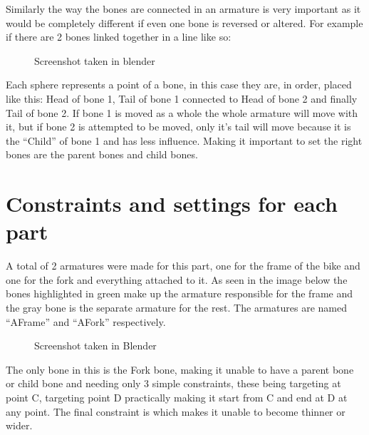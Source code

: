 \documentclass[letterpaper,10pt,english]{jupyterBook}
\begin{document}
\sphinxAtStartPar
Similarly the way the bones are connected in an armature is very important as it would be completely different if even one bone is reversed or altered. For example if there are 2 bones linked together in a line like so:

\begin{figure}[htbp]
\centering
\capstart

\noindent{}
\caption{Screenshot taken in blender}\label{\detokenize{Setting the Rig:bones}}\end{figure}

\sphinxAtStartPar
Each sphere represents a point of a bone, in this case they are, in order, placed like this: Head of bone 1, Tail of bone 1 connected to Head of bone 2 and finally Tail of bone 2. If bone 1 is moved as a whole the whole armature will move with it, but if bone 2 is attempted to be moved, only it’s tail will move because it is the “Child” of bone 1 and has less influence. Making it important to set the right bones are the parent bones and child bones.


\section{Constraints and settings for each part}
\label{\detokenize{Setting the Rig:constraints-and-settings-for-each-part}}
\sphinxAtStartPar
A total of 2 armatures were made for this part, one for the frame of the bike and one for the fork and everything attached to it. As seen in the image below the bones highlighted in green make up the armature responsible for the frame and the gray bone is the separate armature for the rest. The armatures are named “AFrame” and “AFork” respectively.

\begin{figure}[htbp]
\centering
\capstart

\noindent{}
\caption{Screenshot taken in Blender}\label{\detokenize{Setting the Rig:bike-rigs}}\end{figure}

\sphinxAtStartPar
{} The only bone in this is the Fork bone, making it unable to have a parent bone or child bone and needing only 3 simple constraints, these being  targeting at point C,  targeting point D practically making it start from C and end at D at any point. The final constraint is  which makes it unable to become thinner or wider.
\end{document}
